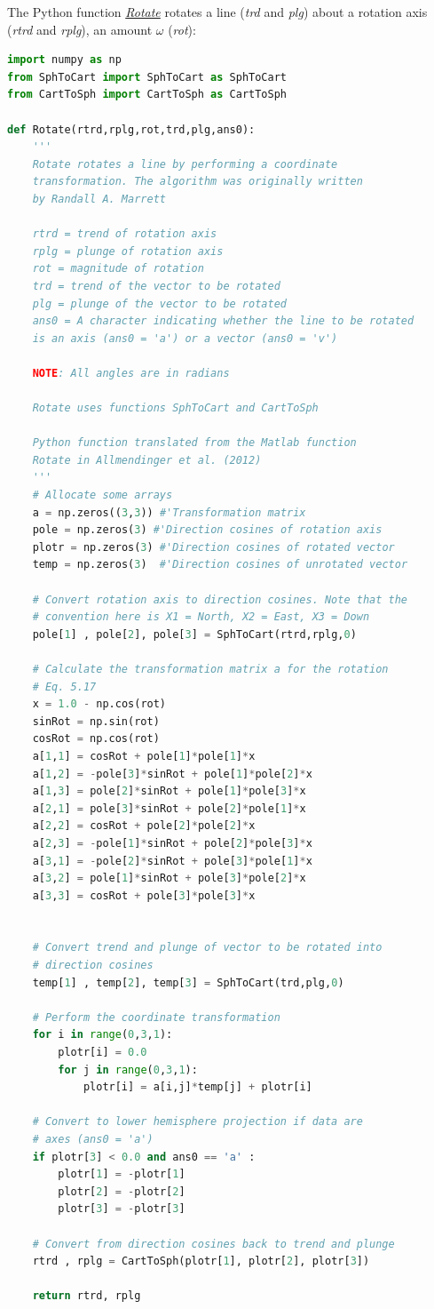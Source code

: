 \documentclass[a4paper , 12pt]{book}
\begin{document}
The Python function \href{http://github.com}{\textit{Rotate}} rotates a line (\textit{trd} and \textit{plg}) about a rotation axis (\textit{rtrd} and \textit{rplg}), an amount $\omega$ (\textit{rot}):

\begin{lstlisting}[language=Python, frame=single]
import numpy as np
from SphToCart import SphToCart as SphToCart
from CartToSph import CartToSph as CartToSph

def Rotate(rtrd,rplg,rot,trd,plg,ans0):
    '''
	Rotate rotates a line by performing a coordinate 
	transformation. The algorithm was originally written 
	by Randall A. Marrett

	rtrd = trend of rotation axis
	rplg = plunge of rotation axis
	rot = magnitude of rotation
	trd = trend of the vector to be rotated
	plg = plunge of the vector to be rotated
	ans0 = A character indicating whether the line to be rotated 
	is an axis (ans0 = 'a') or a vector (ans0 = 'v')

	NOTE: All angles are in radians
	
	Rotate uses functions SphToCart and CartToSph
	
	Python function translated from the Matlab function 
	Rotate in Allmendinger et al. (2012)
	'''
    # Allocate some arrays
    a = np.zeros((3,3)) #'Transformation matrix
    pole = np.zeros(3) #'Direction cosines of rotation axis
    plotr = np.zeros(3) #'Direction cosines of rotated vector
    temp = np.zeros(3)  #'Direction cosines of unrotated vector
    
    # Convert rotation axis to direction cosines. Note that the 
    # convention here is X1 = North, X2 = East, X3 = Down
    pole[1] , pole[2], pole[3] = SphToCart(rtrd,rplg,0)
    
    # Calculate the transformation matrix a for the rotation
    # Eq. 5.17
    x = 1.0 - np.cos(rot)
    sinRot = np.sin(rot)
    cosRot = np.cos(rot)
    a[1,1] = cosRot + pole[1]*pole[1]*x
    a[1,2] = -pole[3]*sinRot + pole[1]*pole[2]*x
    a[1,3] = pole[2]*sinRot + pole[1]*pole[3]*x
    a[2,1] = pole[3]*sinRot + pole[2]*pole[1]*x
    a[2,2] = cosRot + pole[2]*pole[2]*x
    a[2,3] = -pole[1]*sinRot + pole[2]*pole[3]*x
    a[3,1] = -pole[2]*sinRot + pole[3]*pole[1]*x
    a[3,2] = pole[1]*sinRot + pole[3]*pole[2]*x
    a[3,3] = cosRot + pole[3]*pole[3]*x
    
    
    # Convert trend and plunge of vector to be rotated into 
    # direction cosines
    temp[1] , temp[2], temp[3] = SphToCart(trd,plg,0)
    
    # Perform the coordinate transformation
    for i in range(0,3,1):
        plotr[i] = 0.0
        for j in range(0,3,1):
            plotr[i] = a[i,j]*temp[j] + plotr[i]
            
    # Convert to lower hemisphere projection if data are
    # axes (ans0 = 'a')
    if plotr[3] < 0.0 and ans0 == 'a' :
        plotr[1] = -plotr[1]
        plotr[2] = -plotr[2]
        plotr[3] = -plotr[3]
        
    # Convert from direction cosines back to trend and plunge
    rtrd , rplg = CartToSph(plotr[1], plotr[2], plotr[3])
    
    return rtrd, rplg
\end{lstlisting}
\end{document}

